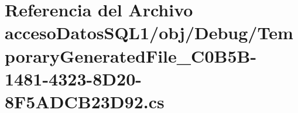 \hypertarget{acceso_datos_s_q_l1_2obj_2_debug_2_temporary_generated_file__036_c0_b5_b-1481-4323-8_d20-8_f5_a_d_c_b23_d92_8cs}{}\section{Referencia del Archivo acceso\+Datos\+S\+Q\+L1/obj/\+Debug/\+Temporary\+Generated\+File\+\_\+C0\+B5\+B-\/1481-\/4323-\/8\+D20-\/8\+F5\+A\+D\+C\+B23\+D92.cs}
\label{acceso_datos_s_q_l1_2obj_2_debug_2_temporary_generated_file__036_c0_b5_b-1481-4323-8_d20-8_f5_a_d_c_b23_d92_8cs}
